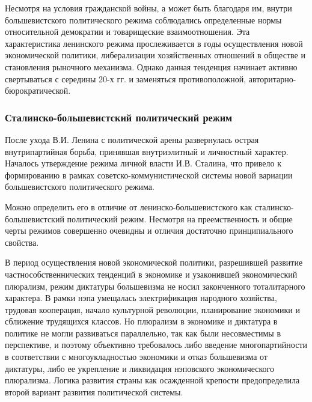 \documentclass{article}
\begin{document}
\hfill

Несмотря на условия гражданской войны, а может быть благодаря им, внутри большевистского политического режима соблюдались определенные нормы относительной демократии и товарищеские взаимоотношения. Эта характеристика ленинского режима прослеживается в годы осуществления новой экономической политики, либерализации хозяйственных отношений в обществе и становления рыночного механизма. Однако данная тенденция начинает активно свертываться с середины 20-х гг. и заменяться противоположной, авторитарно-бюрократической.

\subsubsection{Сталинско-большевистский политический режим}

После ухода В.И. Ленина с политической арены развернулась острая внутрипартийная борьба, принявшая внутриэлитный и личностный характер. Началось утверждение режима личной власти И.В. Сталина, что привело к формированию в рамках советско-коммунистической системы новой вариации большевистского политического режима.

\hfill

Можно определить его в отличие от ленинско-большевистского как сталинско-большевистский политический режим. Несмотря на преемственность и общие черты режимов совершенно очевидны и отличия достаточно принципиального свойства.

\hfill

В период осуществления новой экономической политики, разрешившей развитие частнособственнических тенденций в экономике и узаконившей экономический плюрализм, режим диктатуры большевизма не носил законченного тоталитарного характера. В рамки нэпа умещалась электрификация народного хозяйства, трудовая кооперация, начало культурной революции, планирование экономики и сближение трудящихся классов. Но плюрализм в экономике и диктатура в политике не могли развиваться параллельно, так как были несовместимы в перспективе, и поэтому объективно требовалось либо введение многопартийности в соответствии с многоукладностью экономики и отказ большевизма от диктатуры, либо ее укрепление и ликвидация нэповского экономического плюрализма. Логика развития страны как осажденной крепости предопределила второй вариант развития политической системы.

\hfill
\end{document}
